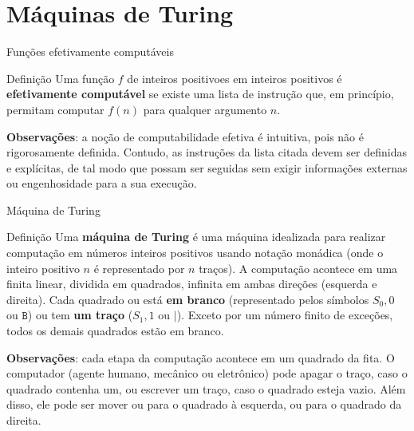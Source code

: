 \section{Máquinas de Turing}

\begin{frame}[fragile]{Funções efetivamente computáveis}

    \begin{block}{Definição}
        Uma função $f$ de inteiros positivoes em inteiros positivos é \textbf{efetivamente 
        computável} se existe uma lista de instrução que, em princípio, permitam computar $f(n)$
        para qualquer argumento $n$.
    \end{block}

    \vspace{0.1in}

    \textbf{Observações}: a noção de computabilidade efetiva é intuitiva, pois não é rigorosamente
    definida. Contudo, as instruções da lista citada devem ser definidas e explícitas, de tal modo
    que possam ser seguidas sem exigir informações externas ou engenhosidade para a sua execução.
\end{frame}


\begin{frame}[fragile]{Máquina de Turing}

    \begin{block}{Definição}
        Uma \textbf{máquina de Turing} é uma máquina idealizada para realizar computação em 
        números inteiros positivos usando notação monádica (onde o inteiro positivo $n$ é 
        representado por $n$ traços). A computação acontece em uma finita linear, dividida em
        quadrados, infinita em ambas direções (esquerda e direita). Cada quadrado ou está 
        \textbf{em branco} (representado pelos símbolos $S_0, 0$ ou $\mathtt{B}$) ou tem 
        \textbf{um traço} ($S_1, 1$ ou $\mathtt{|}$).
        Exceto por um número finito de exceções, todos os demais quadrados estão em branco.
    \end{block}

    \vspace{0.1in}

    \textbf{Observações}: cada etapa da computação acontece em um quadrado da fita. O computador
    (agente humano, mecânico ou eletrônico) pode apagar o traço, caso o quadrado contenha um, ou 
    escrever um traço, caso o quadrado
    esteja vazio. Além disso, ele pode ser mover ou para o quadrado à esquerda, ou para o quadrado
    da direita.
\end{frame}

